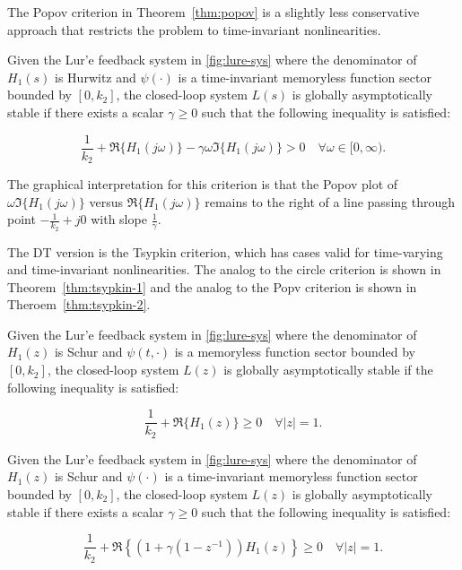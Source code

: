 The Popov criterion in Theorem~\ref{thm:popov} is a slightly less conservative approach that restricts the problem to time-invariant nonlinearities. 

\begin{thm} \label{thm:popov}
	Given the Lur'e feedback system in \autoref{fig:lure-sys} where the denominator of $H_1(s)$ is Hurwitz and $\psi(\cdot)$ is a time-invariant memoryless function sector bounded by $[0, k_2]$, the closed-loop system $L(s)$  is globally asymptotically stable if there exists a scalar $\gamma \geq 0$ such that the following inequality is satisfied:
	
	\begin{equation}
		\frac{1}{k_2} + \Re\{H_1(j\omega)\} - \gamma\omega\Im\{H_1(j\omega)\} > 0 \quad \forall \omega \in [0, \infty).
	\end{equation}
\end{thm}

The graphical interpretation for this criterion is that the Popov plot of $\omega\Im\{H_1(j\omega)\}$ versus $\Re\{H_1(j\omega)\}$ remains to the right of a line passing through point $-\frac{1}{k_2} + j0$ with slope $\frac{1}{\gamma}$. 

The \gls{DT} version is the Tsypkin criterion, which has cases valid for time-varying and time-invariant nonlinearities. The analog to the circle criterion is shown in Theorem~\ref{thm:tsypkin-1} and the analog to the Popv criterion is shown in Theroem~\ref{thm:tsypkin-2}.

\begin{thm} \label{thm:tsypkin-1}
	Given the Lur'e feedback system in \autoref{fig:lure-sys} where the denominator of $H_1(z)$ is Schur and $\psi(t,\cdot)$ is a memoryless function sector bounded by $[0, k_2]$, the closed-loop system $L(z)$  is globally asymptotically stable if the following inequality is satisfied:
	
	\begin{equation}
		\frac{1}{k_2} + \Re\{H_1(z)\}\geq 0 \quad \forall |z| = 1.
	\end{equation}
\end{thm}

\begin{thm} \label{thm:tsypkin-2}
	Given the Lur'e feedback system in \autoref{fig:lure-sys} where the denominator of $H_1(z)$ is Schur and $\psi(\cdot)$ is a time-invariant memoryless function sector bounded by $[0, k_2]$, the closed-loop system $L(z)$  is globally asymptotically stable if there exists a scalar $\gamma \geq 0$ such that the following inequality is satisfied:
	
	\begin{equation}
		\frac{1}{k_2} + \Re\left\{\left(1 + \gamma\left(1 - z^{-1}\right)\right)H_1(z)\right\}\geq 0 \quad \forall |z| = 1.
	\end{equation}
\end{thm}

